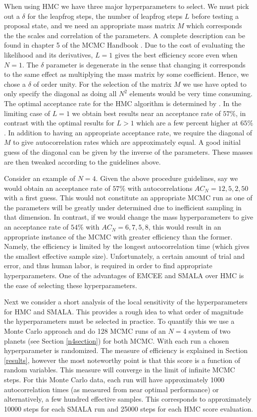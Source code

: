 \documentclass{aa}
\begin{document}
When using HMC we have three major hyperparameters to select. We must pick out a $\delta$ for the leapfrog steps, the number of leapfrog steps $L$ before testing a proposal state, and we need an appropriate mass matrix $M$ which corresponds the the scales and correlation of the parameters. A complete description can be found in chapter 5 of the MCMC Handbook \cite{1206.1901}. Due to the cost of evaluating the likelihood and its derivatives, $L=1$ gives the best efficiency score even when $N=1$. The $\delta$ parameter is degenerate in the sense that changing it corresponds to the same effect as multiplying the mass matrix by some coefficient. Hence, we chose a $\delta$ of order unity. For the selection of the matrix $M$ we use have opted to only specify the diagonal as doing all $N^2$ elements would be very time consuming. The optimal acceptance rate for the HMC algorithm is determined by \cite{1001.4460}. In the limiting case of $L=1$ we obtain best results near an acceptance rate of $57\%$, in contrast with the optimal results for $L>1$ which are a few percent higher at $65\%$. In addition to having an appropriate acceptance rate, we require the diagonal of $M$ to give autocorrelation rates which are approximately equal. A good initial guess of the diagonal can be given by the inverse of the parameters. These masses are then tweaked according to the guidelines above.

Consider an example of $N=4$. Given the above procedure guidelines, say we would obtain an acceptance rate of $57\%$ with autocorrelations $AC_N = 12, 5, 2, 50$ with a first guess. This would not constitute an appropriate MCMC run as one of the parameters will be greatly under determined due to inefficient sampling in that dimension. In contrast, if we would change the mass hyperparameters to give an acceptance rate of $54\%$ with $AC_N = 6, 7, 5, 8$, this would result in an appropriate instance of the MCMC with greater efficiency than the former. Namely, the efficiency is limited by the longest autocorrelation time (which gives the smallest effective sample size). Unfortunately, a certain amount of trial and error, and thus human labor, is required in order to find appropriate hyperparameters. One of the advantages of EMCEE and SMALA over HMC is the ease of selecting these hyperparameters.

Next we consider a short analysis of the local sensitivity of the hyperparameters for HMC and SMALA. This provides a rough idea to what order of magnitude the hyperparameters must be selected in practice. To quantify this we use a Monte Carlo approach and do 128 MCMC runs of an $N=4$ system of two planets (see Section \ref{n4section}) for both MCMC. With each run a chosen hyperparameter is randomized. The measure of efficiency is explained in Section \ref{results}, however the most noteworthy point is that this score is a function of random variables. This measure will converge in the limit of infinite MCMC steps. For this Monte Carlo data, each run will have approximately 1000 autocorrelation times (as measured from near optimal performance) or alternatively, a few hundred effective samples. This corresponds to approximately 10000 steps for each SMALA run and 25000 steps for each HMC score evaluation. 
\end{document}

